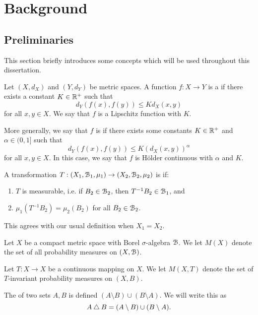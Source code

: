 \chapter{Background}
\section{Preliminaries}
This section briefly introduces some concepts which will be used throughout this dissertation.

\begin{definition}
	Let $(X, d_X)$ and $(Y, d_Y)$ be metric spaces. A function $f : X \to Y$ is a  if there exists a constant $K \in \mathbb{R}^+$ such that
	\[
		d_Y(f(x), f(y)) \leq Kd_X(x, y)
	\]
	for all $x, y \in X$. We say that $f$ is a Lipschitz function with  $K$.~\cite[p154]{searcoid:metric-spaces}
	
	More generally, we say that $f$ is  if there exists some constants $K \in \mathbb{R}^+$ and $\alpha \in (0, 1]$ such that
	\[
	d_Y(f(x), f(y)) \leq K(d_X(x, y))^\alpha
	\]
	for all $x, y \in X$. In this case, we say that $f$ is H\"older continuous with  $\alpha$ and  $K$.~\cite[p143]{brin-stuck:dynsys}
\end{definition}

\begin{definition}
	A transformation $T : (X_1, \mathcal{B}_1, \mu_1) \to (X_2, \mathcal{B}_2, \mu_2)$ is  if:
	\begin{enumerate}
		\item $T$ is measurable, i.e. if $B_2 \in \mathcal{B}_2$, then $T^{-1}{B_2} \in \mathcal{B}_1$, and
		\item $\mu_1(T^{-1}{B_2}) = \mu_2(B_2)$ for all $B_2 \in \mathcal{B}_2$.
	\end{enumerate}
	This agrees with our usual definition when $X_1 = X_2$.
\end{definition}

\begin{definition}
	Let $X$ be a compact metric space with Borel $\sigma$-algebra $\mathcal{B}$. We let $M(X)$ denote the set of all probability measures on $(X, \mathcal{B})$.
	
	Let $T : X \to X$ be a continuous mapping on $X$. We let $M(X, T)$ denote the set of $T$-invariant probability measures on $(X, B)$.
\end{definition}

\begin{definition}
	The  of two sets $A, B$ is defined $(A \setminus B) \cup (B \setminus A)$. We will write this as
	\begin{equation*}
		A \bigtriangleup B = (A \setminus B) \cup (B \setminus A).
	\end{equation*}
\end{definition}

